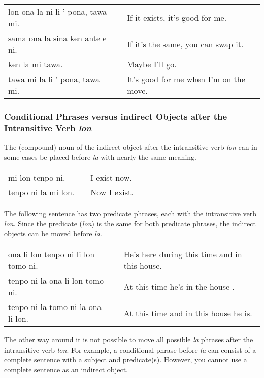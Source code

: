 \begin{supertabular}{p{5,5cm}|ll}
lon ona la ni li ' pona, tawa mi. && If it exists, it's good for me. \\
sama ona la sina ken ante e ni. && If it's the same, you can swap it. \\
ken la mi tawa. && Maybe I'll go. \\
tawa mi la li ' pona, tawa mi.  && It's good for me when I'm on the move. \\
\end{supertabular}

%
%
\subsubsection*{Conditional Phrases versus indirect Objects after the Intransitive Verb \textit{lon} }
%
The (compound) noun of the indirect object after the intransitive verb \textit{lon} can in some cases be placed before \textit{la} with nearly the same meaning.

\begin{supertabular}{p{5,5cm}|ll}
mi lon tenpo ni. && I exist now. \\
tenpo ni la mi lon. && Now I exist. \\
\end{supertabular}

The following sentence has two predicate phrases, each with the intransitive verb \textit{lon}. 
Since the predicate (\textit{lon}) is the same for both predicate phrases, the indirect objects can be moved before \textit{la}. 

\begin{supertabular}{p{5,5cm}|ll}
ona li lon tenpo ni li lon tomo ni. && He's here during this time and in this house. \\
tenpo ni la ona li lon tomo ni.     && At this time he's in the house . \\  
tenpo ni la tomo ni la ona li lon.  && At this time and in this house he is. \\  
\end{supertabular}

The other way around it is not possible to move all possible \textit{la} phrases after the intransitive verb \textit{lon}. 
For example, a conditional phrase before \textit{la} can consist of a complete sentence with a subject and predicate(s). 
However, you cannot use a complete sentence as an indirect object.

